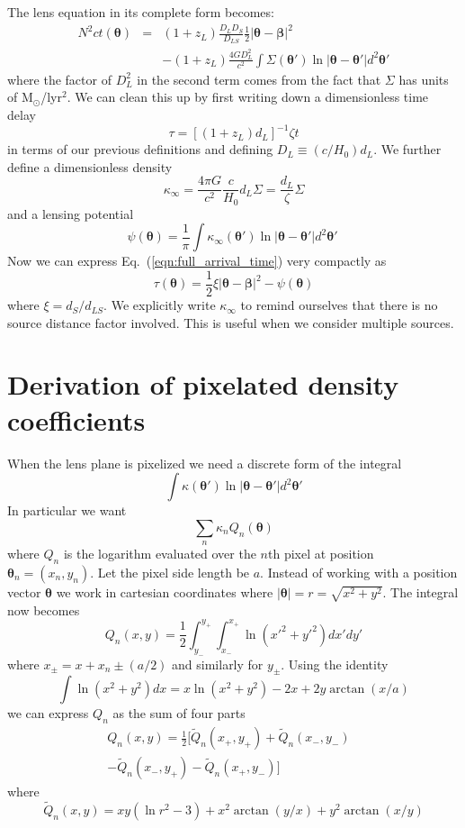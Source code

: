 \documentclass[galley,usenatbib]{mn2e}
\renewcommand{\vec}[1]{\ensuremath{\boldsymbol{#1}}}
\newcommand{\Msun}{\ensuremath{\mathrm{M}_\odot}}
\newcommand{\eqnref}[1] {Eq.~(\ref{#1})}
\begin{document}
The lens equation in its complete form becomes:
%
\begin{eqnarray}
N^2ct(\vec\theta) & = & (1+z_L)\frac{D_{L}D_{S}}{D_{LS}}\frac12 |\vec\theta - \vec\beta|^2 \nonumber \\
& & - (1+z_L)\frac{4GD_{L}^2}{c^2}\int \Sigma(\vec\theta') \ln |\vec\theta-\vec\theta'| d^2\vec\theta'
\label{eqn:full_arrival_time}
\end{eqnarray}
%
where the factor of $D_L^2$ in the second term comes from the fact that
$\Sigma$ has units of \Msun/lyr$^2$. We can clean this up by first writing down
a dimensionless time delay
%
\begin{equation}
\tau = \left[ (1+z_L) d_L\right]^{-1}\zeta t
\label{tau}
\end{equation}
%
in terms of our previous definitions and defining $D_L \equiv (c/H_0)d_L$. We
further define a dimensionless density
%
\begin{equation}
\kappa_\infty = \frac{4\pi G}{c^2}\frac{c}{H_0}d_L\Sigma
              = \frac{d_L}{\zeta}\Sigma
\end{equation}
%
and a lensing potential
%
\begin{equation}
\psi(\vec\theta) = \frac1\pi \int \kappa_\infty(\vec\theta') \ln|\vec\theta - \vec\theta'| d^2\vec\theta'\
\label{lensing potential}
\end{equation}
%
Now we can express \eqnref{eqn:full_arrival_time} very compactly as
%
\begin{equation}
\tau(\vec\theta) = \frac12 \xi |\vec\theta-\vec\beta|^2 - \psi(\vec\theta)
\label{arrival time}
\end{equation}
%
where $\xi=d_S / d_{LS}$.  We explicitly write $\kappa_\infty$ to remind
ourselves that there is no source distance factor involved. This is useful when
we consider multiple sources.

\section{Derivation of pixelated density coefficients}
\label{Q derivation}
When the lens plane is pixelized we need a discrete form of the integral
%
\[\int \kappa(\vec\theta') \ln |\vec\theta-\vec\theta'| d^2\vec\theta' \]
%
In particular we want
%
\[\sum_n \kappa_n Q_n(\vec\theta)\]
%
where $Q_n$ is the logarithm evaluated over the $n$th pixel at position
$\vec\theta_n = (x_n, y_n)$. Let the pixel side length be $a$.  Instead of
working with a position vector $\vec\theta$ we work in cartesian coordinates
where 
%
$|\vec\theta| = r = \sqrt{x^2 + y^2}$. The integral now becomes
%
\[Q_n(x,y) = \frac12 \int_{y_-}^{y_+}\int_{x_-}^{x_+} \ln (x'^2+y'^2) dx' dy'\]
%
where $x_\pm = x + x_n \pm (a/2)$ and similarly for $y_\pm$.
Using the identity
%
\[\int \ln(x^2+y^2) dx = x \ln(x^2+y^2) - 2x + 2y\arctan(x/a) \]
%
we can express $Q_n$ as the sum of four parts
%
\begin{align*}
Q_n(x,y) = \frac12 [\tilde Q_n(x_+,y_+)
                  + \tilde Q_n(x_-,y_-) & 
\\                - \tilde Q_n(x_-,y_+)
                  - \tilde Q_n(x_+,y_-) ]
\end{align*}
%
where
%
\[\tilde Q_n(x,y) = xy(\ln r^2 - 3) + x^2\arctan(y/x) + y^2\arctan(x/y)\]
\end{document}
